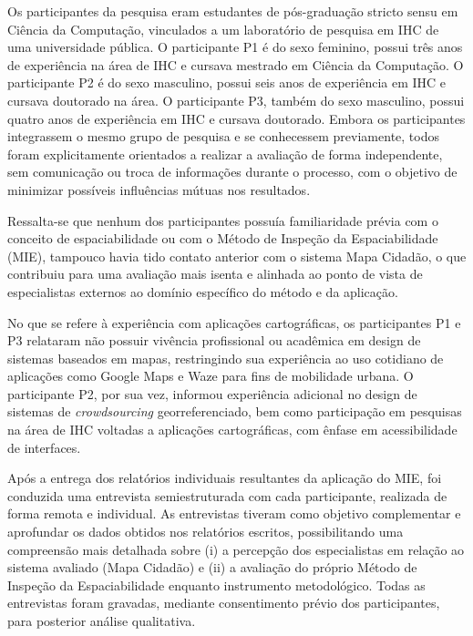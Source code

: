 \documentclass[12pt]{article}
\begin{document}
Os participantes da pesquisa eram estudantes de pós-graduação stricto sensu em Ciência da Computação, vinculados a um laboratório de pesquisa em IHC de uma universidade pública. O participante P1 é do sexo feminino, possui três anos de experiência na área de IHC e cursava mestrado em Ciência da Computação. O participante P2 é do sexo masculino, possui seis anos de experiência em IHC e cursava doutorado na área. O participante P3, também do sexo masculino, possui quatro anos de experiência em IHC e cursava doutorado. Embora os participantes integrassem o mesmo grupo de pesquisa e se conhecessem previamente, todos foram explicitamente orientados a realizar a avaliação de forma independente, sem comunicação ou troca de informações durante o processo, com o objetivo de minimizar possíveis influências mútuas nos resultados.

Ressalta-se que nenhum dos participantes possuía familiaridade prévia com o conceito de espaciabilidade ou com o Método de Inspeção da Espaciabilidade (MIE), tampouco havia tido contato anterior com o sistema Mapa Cidadão, o que contribuiu para uma avaliação mais isenta e alinhada ao ponto de vista de especialistas externos ao domínio específico do método e da aplicação.

No que se refere à experiência com aplicações cartográficas, os participantes P1 e P3 relataram não possuir vivência profissional ou acadêmica em design de sistemas baseados em mapas, restringindo sua experiência ao uso cotidiano de aplicações como Google Maps e Waze para fins de mobilidade urbana. O participante P2, por sua vez, informou experiência adicional no design de sistemas de \textit{crowdsourcing} georreferenciado, bem como participação em pesquisas na área de IHC voltadas a aplicações cartográficas, com ênfase em acessibilidade de interfaces.

Após a entrega dos relatórios individuais resultantes da aplicação do MIE, foi conduzida uma entrevista semiestruturada com cada participante, realizada de forma remota e individual. As entrevistas tiveram como objetivo complementar e aprofundar os dados obtidos nos relatórios escritos, possibilitando uma compreensão mais detalhada sobre (i) a percepção dos especialistas em relação ao sistema avaliado (Mapa Cidadão) e (ii) a avaliação do próprio Método de Inspeção da Espaciabilidade enquanto instrumento metodológico. Todas as entrevistas foram gravadas, mediante consentimento prévio dos participantes, para posterior análise qualitativa.
\end{document}

